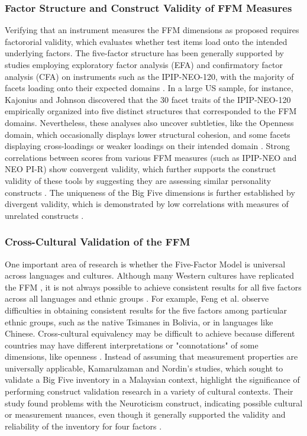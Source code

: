 \documentclass{DESSThesis}
\begin{document}
\subsubsection{Factor Structure and Construct Validity of FFM Measures}
Verifying that an instrument measures the FFM dimensions as proposed requires factororial validity, which evaluates whether test items load onto the intended underlying factors. The five-factor structure has been generally supported by studies employing exploratory factor analysis (EFA) and confirmatory factor analysis (CFA) on instruments such as the IPIP-NEO-120, with the majority of facets loading onto their expected domains \cite{kajonius_assessing_2019,johnson_measuring_2014}. In a large US sample, for instance, Kajonius and Johnson discovered that the 30 facet traits of the IPIP-NEO-120 empirically organized into five distinct structures that corresponded to the FFM domains. Nevertheless, these analyses also uncover subtleties, like the Openness domain, which occasionally displays lower structural cohesion, and some facets displaying cross-loadings or weaker loadings on their intended domain \cite{kajonius_assessing_2019}. Strong correlations between scores from various FFM measures (such as IPIP-NEO and NEO PI-R) show convergent validity, which further supports the construct validity of these tools by suggesting they are assessing similar personality constructs \cite{maples_test_2014,johnson_measuring_2014}. The uniqueness of the Big Five dimensions is further established by divergent validity, which is demonstrated by low correlations with measures of unrelated constructs \cite{rammstedt_big_2014}.

\subsubsection{Cross-Cultural Validation of the FFM}
One important area of research is whether the Five-Factor Model is universal across languages and cultures. Although many Western cultures have replicated the FFM \cite{rammstedt_big_2014}, it is not always possible to achieve consistent results for all five factors across all languages and ethnic groups \cite{feng_five-factor_2024}. For example, Feng et al. observe difficulties in obtaining consistent results for the five factors among particular ethnic groups, such as the native Tsimanes in Bolivia, or in languages like Chinese. Cross-cultural equivalency may be difficult to achieve because different countries may have different interpretations or "connotations" of some dimensions, like openness \cite{feng_five-factor_2024}. Instead of assuming that measurement properties are universally applicable, Kamarulzaman and Nordin's studies, which sought to validate a Big Five inventory in a Malaysian context, highlight the significance of performing construct validation research in a variety of cultural contexts. Their study found problems with the Neuroticism construct, indicating possible cultural or measurement nuances, even though it generally supported the validity and reliability of the inventory for four factors \cite{kamarulzaman_confirmatory_2012}.
\end{document}
